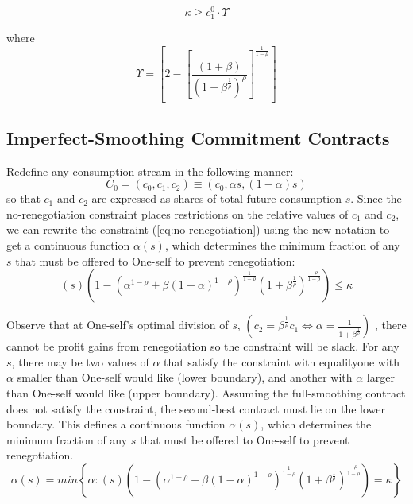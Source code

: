 \documentclass[11pt,english]{article}
\theoremstyle{plain}
\theoremstyle{definition}
\begin{document}
\begin{equation}
\kappa\geq c_{1}^{0}\cdotp\Upsilon\label{eq:smoothing-no-renegotiation}
\end{equation}

where 
\begin{equation}
\Upsilon=\left[2-\left[\frac{(1+\beta)}{\left(1+\beta^{\frac{1}{\rho}}\right)^{\rho}}\right]^{\frac{1}{1-\rho}}\right]\label{eq:upsilon}
\end{equation}


\subsection{Imperfect-Smoothing Commitment Contracts}

Redefine any consumption stream in the following manner: 
\begin{equation}
C_{0}=\left(c_{0},c_{1},c_{2}\right)\equiv\left(c_{0},\alpha s,\left(1-\alpha\right)s\right)\label{eq:new-notation}
\end{equation}
so that $c_{1}$ and $c_{2}$ are expressed as shares of total future
consumption $s$. Since the no-renegotiation constraint places restrictions
on the relative values of $c_{1}$ and $c_{2}$, we can rewrite the
constraint (\ref{eq:no-renegotiation}) using the new notation to get
a continuous function $\alpha\left(s\right)$, which determines the
minimum fraction of any $s$ that must be offered to One-self to prevent
renegotiation: 
\begin{equation}
\left(s\right)\left(1-\left(\alpha^{1-\rho}+\beta\left(1-\alpha\right)^{1-\rho}\right)^{\frac{1}{1-\rho}}\left(1+\beta^{\frac{1}{\rho}}\right)^{\frac{-\rho}{1-\rho}}\right)\leq\kappa\label{eq:no-renegotiation-alpha-s}
\end{equation}

Observe that at One-self's optimal division of $s$, $\left(c_{2}=\beta^{\frac{1}{\rho}}c_{1}\Longleftrightarrow\alpha=\frac{1}{1+\beta^{\frac{1}{\rho}}}\right)$
, there cannot be profit gains from renegotiation so the constraint
will be slack. For any $s$, there may be two values of $\alpha$
that satisfy the constraint with equality\textendash one with $\alpha$
smaller than One-self would like (lower boundary), and another with
$\alpha$ larger than One-self would like (upper boundary). Assuming
the full-smoothing contract does not satisfy the constraint, the second-best
contract must lie on the lower boundary. This defines a continuous
function $\alpha\left(s\right)$, which determines the minimum fraction
of any $s$ that must be offered to One-self to prevent renegotiation.
\begin{equation}
\alpha\left(s\right)=min\left\{ \alpha:\left(s\right)\left(1-\left(\alpha^{1-\rho}+\beta\left(1-\alpha\right)^{1-\rho}\right)^{\frac{1}{1-\rho}}\left(1+\beta^{\frac{1}{\rho}}\right)^{\frac{-\rho}{1-\rho}}\right)=\kappa\right\} \label{eq:alpha-1}
\end{equation}
\end{document}
